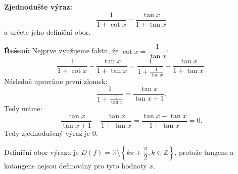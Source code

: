 \documentclass[12pt,a4paper]{article}
\begin{document}
\begin{examplebox}
    \textbf{Zjednodušte výraz:}
    \[
    \frac{1}{1 + \cot x} - \frac{\tan x}{1 + \tan x}
    \]
    a určete jeho definiční obor.

    \medskip
    \textbf{Řešení:}
    Nejprve využijeme faktu, že $\cot x = \dfrac{1}{\tan x}$:
    \[
    \frac{1}{1 + \cot x} - \frac{\tan x}{1 + \tan x} = \frac{1}{1 + \frac{1}{\tan x}} - \frac{\tan x}{1 + \tan x}.
    \]
    Následně upravíme první zlomek:
    \[
    \frac{1}{1 + \frac{1}{\tan x}} = \frac{\tan x}{\tan x + 1}.
    \]
    Tedy máme:
    \[
    \frac{\tan x}{\tan x + 1} - \frac{\tan x}{1 + \tan x} = \frac{\tan x - \tan x}{1 + \tan x} = 0.
    \]
    Tedy zjednodušený výraz je $0$.
    
    \medskip
    Definiční obor výrazu je $D(f)=\mathbb{R} \setminus \left\{k\pi + \dfrac{\pi}{2}, k \in \mathbb{Z}\right\}$,
    protože tangens a kotangens nejsou definovány pro tyto hodnoty $x$.
\end{examplebox}
\end{document}
